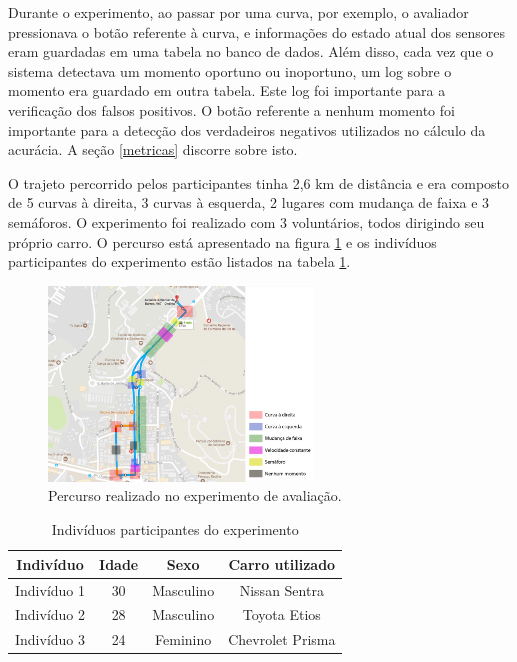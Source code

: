 Durante o experimento, ao passar por uma curva, por exemplo, o avaliador pressionava o botão
referente à curva, e informações do estado atual dos sensores eram guardadas em uma tabela no banco de dados.
Além disso, cada vez que o sistema detectava um momento oportuno ou inoportuno, um log sobre o
momento era guardado em outra tabela. Este log foi importante para a verificação dos falsos positivos.
O botão referente a nenhum momento foi importante para a detecção dos verdadeiros negativos utilizados
no cálculo da acurácia. A seção \ref{metricas} discorre sobre isto.

O trajeto percorrido pelos participantes tinha 2,6 km de distância e era composto de 5 curvas à direita,
3 curvas à esquerda, 2 lugares com mudança de faixa e 3 semáforos. O experimento foi realizado com 3
voluntários, todos dirigindo seu próprio carro. O percurso está apresentado na figura \ref{percurso} e os
indivíduos participantes do experimento estão listados na tabela \ref{participantes}.

\begin{figure}[H]
\centering
\includegraphics[width=0.63\textwidth]{images/percurso.png}
\caption{Percurso realizado no experimento de avaliação.}
\label{percurso}
\end{figure}

\begin{table}[h]
\centering
\caption{Indivíduos participantes do experimento}
\label{participantes}
\begin{tabular}{|c|c|c|c|}
\hline
\textbf{Indivíduo} & \textbf{Idade} & \textbf{Sexo} & \textbf{Carro utilizado} \\ \hline
Indivíduo 1        & 30             & Masculino     & Nissan Sentra            \\ \hline
Indivíduo 2        & 28             & Masculino     & Toyota Etios             \\ \hline
Indivíduo 3        & 24             & Feminino      & Chevrolet Prisma         \\ \hline
\end{tabular}
\end{table}

